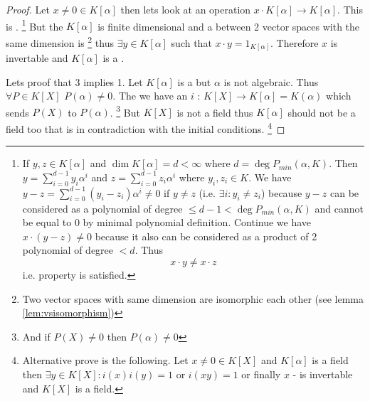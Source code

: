 \begin{proposition}
\begin{proof}
    Let $x \ne 0 \in
    K\left[\alpha\right]$ then lets look at an operation
    $x \cdot K\left[\alpha\right] \rightarrow
    K\left[\alpha\right]$. This is .
    \footnote{
      If $y, z \in K\left[\alpha\right]$ and
      $\dim K\left[\alpha\right] = d < \infty$ where
      $d = \deg P_{min}\left(\alpha, K\right)$. Then
      $y = \sum_{i=0}^{d-1} y_i \alpha^i$ and
      $z = \sum_{i=0}^{d-1} z_i \alpha^i$ where $y_i, z_i \in K$.
      We have $y - z = \sum_{i=0}^{d-1} \left(y_i - z_i\right)
      \alpha^i \ne 0$ if $y \ne z$ (i.e.
      $\exists i: y_i \ne z_i$)
      because $y -z$ can be considered as a polynomial of degree
      $ \le d - 1 < \deg P_{min}\left(\alpha, K\right)$ and cannot be equal
      to 0 by minimal polynomial definition.
      Continue we have $x \cdot \left(y - z\right) \ne 0$ because it
      also can be considered as a product of 2 polynomial of degree
      $< d$. 
      Thus
      \[
      x \cdot y  \ne x \cdot z
      \]
      i.e.  property is satisfied.
    }
    But the $K\left[\alpha\right]$ is finite dimensional
     and a  between
    2 vector spaces with the same dimension is
    \footnote{
      Two vector spaces with same dimension are isomorphic each other
      (see lemma \ref{lem:vsisomorphism})
    }
    thus $\exists y \in K\left[\alpha\right]$
    such that $x \cdot y = 1_{K\left[\alpha\right]}$. Therefore $x$ is
    invertable and $K\left[\alpha\right]$ is a
    .

    Lets proof that 3 implies 1. Let $K\left[\alpha\right]$ is a
     but $\alpha$ is not algebraic. Thus $\forall P
    \in K\left[X\right]$ $P(\alpha) \ne 0$. The we have an
      $i$ :
    $K\left[X\right] \to K\left[\alpha\right] = K\left(\alpha\right)$
    which sends $P\left(X\right)$ to $P\left(\alpha\right)$.
    \footnote{
      And if $P\left(X\right) \ne 0$ then
      $P\left(\alpha\right) \ne 0$
    }
    But $K\left[X\right]$
    is not a field thus $K\left[\alpha\right]$ should not be a field
    too that is in contradiction with the initial conditions.
    \footnote{
      Alternative prove is the following.
      Let $x \ne 0 \in K\left[X\right]$ and $K\left[\alpha\right]$ is a
      field then $\exists y \in K\left[X\right]:  i(x) i(y) = 1$ or
      $i(xy) = 1$ or finally $x$ - is invertable and $K\left[X\right]$
      is a field. 
    }
  \end{proof}
  \label{prop:lec1_1}
\end{proposition}


